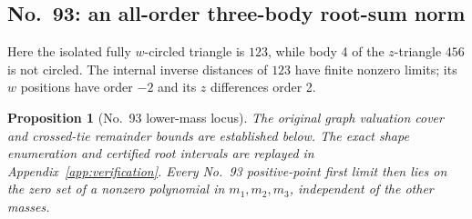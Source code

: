\documentclass[11pt]{amsart}
\newtheorem{proposition}[theorem]{Proposition}
\theoremstyle{remark}
\begin{document}
\subsection{No.~93: an all-order three-body root-sum norm}
Here the isolated fully $w$-circled triangle is $123$, while body 4 of the $z$-triangle $456$ is not circled. The internal inverse distances of $123$ have finite nonzero limits; its $w$ positions have order $-2$ and its $z$ differences order 2.
\begin{proposition}[No.~93 lower-mass locus]\label{prop:no93-locus}
The original graph valuation cover and crossed-tie remainder bounds are established below. The exact shape enumeration and certified root intervals are replayed in Appendix~\ref{app:verification}. Every No.~93 positive-point first limit then lies on the zero set of a nonzero polynomial in $m_1,m_2,m_3$, independent of the other masses.
\end{proposition}
\end{document}
